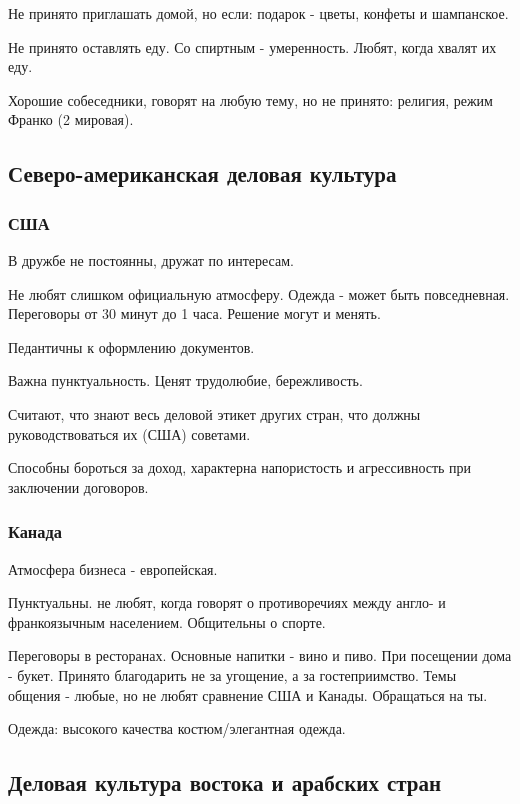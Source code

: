 \documentclass{article}
\begin{document}
Не принято приглашать домой, но если: подарок - цветы, конфеты и шампанское.

Не принято оставлять еду. Со спиртным - умеренность. Любят, когда хвалят их еду.

Хорошие собеседники, говорят на любую тему, но не принято: религия, режим Франко (2 мировая).

\subsection{Северо-американская деловая культура}

\subsubsection{США}

В дружбе не постоянны, дружат по интересам.

Не любят слишком официальную атмосферу. Одежда - может быть повседневная. Переговоры от 30 минут до 1 часа. Решение могут и менять.

Педантичны к оформлению документов.

Важна пунктуальность. Ценят трудолюбие, бережливость.

Считают, что знают весь деловой этикет других стран, что должны руководствоваться их (США) советами.

Способны бороться за доход, характерна напористость и агрессивность при заключении договоров.

\subsubsection{Канада}

Атмосфера бизнеса - европейская.

Пунктуальны. не любят, когда говорят о противоречиях между англо- и франкоязычным населением. Общительны о спорте.

Переговоры в ресторанах. Основные напитки - вино и пиво. При посещении дома - букет. Принято благодарить не за угощение, а за гостеприимство. Темы общения - любые, но не любят сравнение США и Канады. Обращаться на ты.

Одежда: высокого качества костюм/элегантная одежда.

\subsection{Деловая культура востока и арабских стран}
\end{document}
